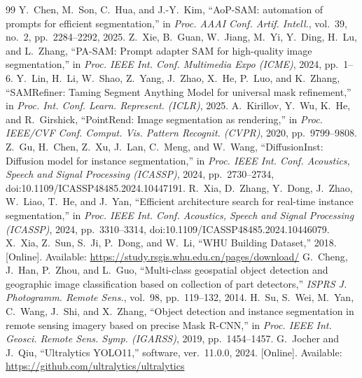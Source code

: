 \documentclass{article}
\begin{document}
\begin{thebibliography}{99}
 Y.~Chen, M.~Son, C.~Hua, and J.-Y.~Kim, ``AoP-SAM: automation of prompts for efficient segmentation,'' in \textit{Proc. AAAI Conf. Artif. Intell.}, vol.~39, no.~2, pp.~2284--2292, 2025.
 Z.~Xie, B.~Guan, W.~Jiang, M.~Yi, Y.~Ding, H.~Lu, and L.~Zhang, ``PA-SAM: Prompt adapter SAM for high-quality image segmentation,'' in \textit{Proc. IEEE Int. Conf. Multimedia Expo (ICME)}, 2024, pp.~1--6.
 Y.~Lin, H.~Li, W.~Shao, Z.~Yang, J.~Zhao, X.~He, P.~Luo, and K.~Zhang, ``SAMRefiner: Taming Segment Anything Model for universal mask refinement,'' in \textit{Proc. Int. Conf. Learn. Represent. (ICLR)}, 2025.
 A.~Kirillov, Y.~Wu, K.~He, and R.~Girshick, ``PointRend: Image segmentation as rendering,'' in \textit{Proc. IEEE/CVF Conf. Comput. Vis. Pattern Recognit. (CVPR)}, 2020, pp.~9799--9808.
 Z.~Gu, H.~Chen, Z.~Xu, J.~Lan, C.~Meng, and W.~Wang, ``DiffusionInst: Diffusion model for instance segmentation,'' in \textit{Proc. IEEE Int. Conf. Acoustics, Speech and Signal Processing (ICASSP)}, 2024, pp.~2730--2734, doi:10.1109/ICASSP48485.2024.10447191.
 R.~Xia, D.~Zhang, Y.~Dong, J.~Zhao, W.~Liao, T.~He, and J.~Yan, ``Efficient architecture search for real-time instance segmentation,'' in \textit{Proc. IEEE Int. Conf. Acoustics, Speech and Signal Processing (ICASSP)}, 2024, pp.~3310--3314, doi:10.1109/ICASSP48485.2024.10446079.
 X.~Xia, Z.~Sun, S.~Ji, P.~Dong, and W.~Li, ``WHU Building Dataset,'' 2018. [Online]. Available: \url{https://study.rsgis.whu.edu.cn/pages/download/}
 G.~Cheng, J.~Han, P.~Zhou, and L.~Guo, ``Multi-class geospatial object detection and geographic image classification based on collection of part detectors,'' \textit{ISPRS J. Photogramm. Remote Sens.}, vol.~98, pp.~119--132, 2014.
 H.~Su, S.~Wei, M.~Yan, C.~Wang, J.~Shi, and X.~Zhang, ``Object detection and instance segmentation in remote sensing imagery based on precise Mask R-CNN,'' in \textit{Proc. IEEE Int. Geosci. Remote Sens. Symp. (IGARSS)}, 2019, pp.~1454--1457.
 G.~Jocher and J.~Qiu, ``Ultralytics YOLO11,'' software, ver.~11.0.0, 2024. [Online]. Available: \url{https://github.com/ultralytics/ultralytics}
\end{thebibliography}
\end{document}
